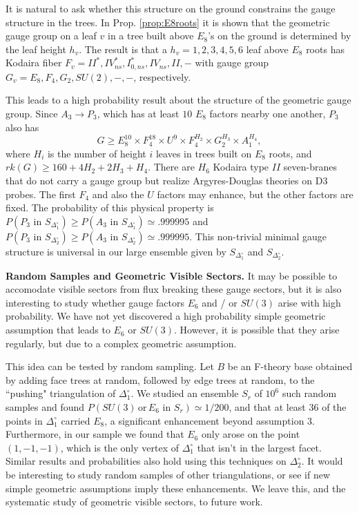\documentclass[aps,prl,twocolumn, superscriptaddress,groupedaddress,nofootinbib]{revtex4-1}
\newcommand{\sdoc}{S_{\Delta_1^\circ}}
\newcommand{\sdtc}{S_{\Delta_2^\circ}}
\newcommand{\doc}{{\Delta_1^\circ}}
\newcommand{\dtc}{{\Delta_2^\circ}}
\newcommand{\textin}{\,\, \text{in} \,\,}
\newcommand{\XXX}[3]{}
\begin{document}
It is natural to ask whether this structure on the ground constrains the gauge
structure in the trees. In Prop. \ref{prop:E8roots} it is shown that the 
geometric gauge group on a leaf $v$ in a tree built above $E_8$'s on the ground
is determined by the leaf height $h_v$. 
The result is that a $h_v=1,2,3,4,5,6$ leaf
above $E_8$ roots has Kodaira fiber $F_v=II^*,IV^*_{ns},I^*_{0,ns},IV_{ns},II,-$
with gauge group $G_v=E_8,F_4,G_2,SU(2),-,-$, respectively.

This leads to a high probability result about the structure of the geometric gauge group.
Since $A_3\to P_3$, which has at least $10$ $E_8$ factors nearby one another, $P_3$
also has
\begin{equation}
G\geq E_8^{10} \times F_4^{18}\times U^9 \times F_4^{H_2}\times G_2^{H_3}\times A_1^{H_4},
\end{equation}
where $H_i$ is the number of height $i$ leaves in trees built on $E_8$ roots,
and $rk(G)\geq 160+4H_2+2H_3+H_4$.
There are $H_6$ Kodaira type $II$ seven-branes that do not carry a gauge group but realize
Argyres-Douglas theories on D3 probes. The first $F_4$ and also
the $U$ factors may enhance, but the other factors are fixed. The probability
of this physical property is $P(P_3\textin \sdoc)\geq P(A_3\textin \sdoc) \simeq .999995$ and $P(P_3\textin \sdtc)\geq P(A_3\textin \sdtc) \simeq .999995$. This non-trivial minimal gauge structure is universal in our large ensemble given by $\sdoc$ and $\sdtc$.



\vspace{.2cm}
\noindent \textbf{Random Samples and Geometric Visible Sectors.} 
It may be possible to accomodate visible sectors from flux breaking
these gauge sectors, but it is also interesting to study whether gauge
factors $E_6$ and / or $SU(3)$ arise with high probability.
We have not yet discovered a high probability simple geometric assumption
that leads to $E_6$ or $SU(3)$. However, it is possible that they arise regularly,
but due to a complex geometric assumption.

This idea can be tested by random sampling. Let $B$ be an F-theory base obtained
by adding face trees at random, followed by edge trees at random, to the ``pushing" 
triangulation of $\doc$. We studied an ensemble $S_r$ of $10^6$ such random samples 
and found $P(SU(3) \, \text{or} \, E_6 \textin S_r)\simeq 1/200$, and that at least 
$36$ of the points in $\doc$ carried $E_8$, a significant enhancement beyond
assumption $3$.  Furthermore, in our sample we found that $E_6$ only
arose on the point $(1,-1,-1)$, which is the only vertex of $\doc$
that isn't in the largest facet.  Similar results and probabilities also hold
using this techniques on $\dtc$. It would be interesting to study random samples of other triangulations, or
see if new simple geometric assumptions imply these enhancements. We leave this,
and the systematic study of geometric visible sectors, to future work.
\end{document}
